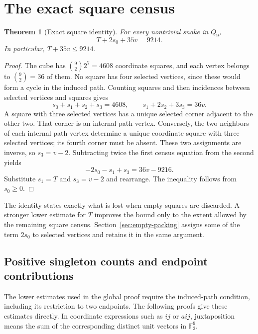 \documentclass[11pt,a4paper]{article}
\newtheorem{theorem}{Theorem}[section]
\theoremstyle{definition}
\theoremstyle{remark}
\newcommand{\Q}{Q}
\begin{document}
\section{The exact square census}\label{sec:incidence}
\begin{theorem}[Exact square identity]\label{thm:exact-square}
For every nontrivial snake in $\Q_9$,
\begin{equation}\label{eq:exact-square}
T+2s_0+35v=9214.
\end{equation}
In particular, $T+35v\le9214$.
\end{theorem}
\begin{proof}
The cube has $\binom92 2^7=4608$ coordinate squares, and each vertex belongs to $\binom92=36$ of them. No square has four selected vertices, since these would form a cycle in the induced path. Counting squares and then incidences between selected vertices and squares gives
\[
s_0+s_1+s_2+s_3=4608,\qquad s_1+2s_2+3s_3=36v.
\]
A square with three selected vertices has a unique selected corner adjacent to the other two. That corner is an internal path vertex. Conversely, the two neighbors of each internal path vertex determine a unique coordinate square with three selected vertices; its fourth corner must be absent. These two assignments are inverse, so $s_3=v-2$. Subtracting twice the first census equation from the second yields
\[
-2s_0-s_1+s_3=36v-9216.
\]
Substitute $s_1=T$ and $s_3=v-2$ and rearrange. The inequality follows from $s_0\ge0$.
\end{proof}

The identity states exactly what is lost when empty squares are discarded. A stronger lower estimate for $T$ improves the bound only to the extent allowed by the remaining square census. Section~\ref{sec:empty-packing} assigns some of the term $2s_0$ to selected vertices and retains it in the same argument.

\subsection{Positive singleton counts and endpoint contributions}
The lower estimates used in the global proof require the induced-path condition, including its restriction to two endpoints. The following proofs give these estimates directly. In coordinate expressions such as $ij$ or $aij$, juxtaposition means the sum of the corresponding distinct unit vectors in $\mathbb F_2^9$.
\end{document}
